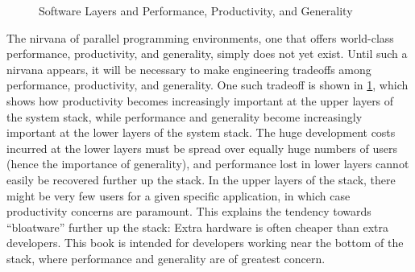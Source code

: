 \begin{figure}
\centering
{}
\caption{Software Layers and Performance, Productivity, and Generality}
\label{fig:intro:Software Layers and Performance; Productivity; and Generality}
\end{figure}

The nirvana of parallel programming environments, one that offers
world-class performance, productivity, and generality, simply does
not yet exist.
Until such a nirvana appears, it will be necessary to make engineering
tradeoffs among performance, productivity, and generality.
One such tradeoff is shown in
\cref{fig:intro:Software Layers and Performance; Productivity; and Generality},
which shows how productivity becomes increasingly important at the upper layers
of the system stack,
while performance and generality become increasingly important at the
lower layers of the system stack.
The huge development costs incurred at the lower layers
must be spread over equally huge numbers of users
(hence the importance of generality), and
performance lost in lower layers cannot easily be
recovered further up the stack.
In the upper layers of the stack, there might be very few users for a given
specific application, in which case productivity concerns are paramount.
This explains the tendency towards ``bloatware'' further up the stack:
Extra hardware is often cheaper than extra developers.
This book is intended for developers working near the bottom
of the stack, where performance and generality are of greatest concern.

